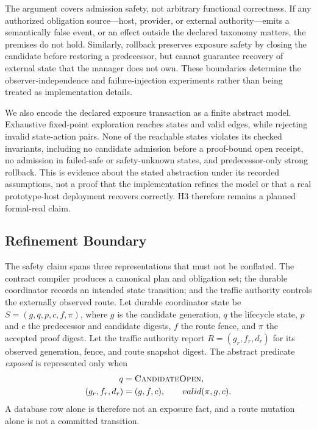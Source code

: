 \documentclass[letterpaper,twocolumn,10pt]{article}
\begin{document}
The argument covers admission safety, not arbitrary functional correctness.
If any authorized obligation source---host, provider, or external
authority---emits a semantically false event, or an effect outside the declared
taxonomy matters, the premises do not hold.  Similarly,
rollback preserves exposure safety by closing the candidate before restoring a
predecessor, but cannot guarantee recovery of external state that the manager
does not own.  These boundaries determine the observer-independence and
failure-injection experiments rather than being treated as implementation
details.

We also encode the declared exposure transaction as a finite abstract model.
Exhaustive fixed-point exploration reaches \ECPATransactionModelStates{} states
and \ECPATransactionModelEdges{} valid edges, while rejecting
\ECPATransactionModelRejections{} invalid state-action pairs.  None of the
reachable states violates its \ECPATransactionModelInvariants{} checked
invariants, including no candidate admission before a proof-bound open receipt,
no admission in failed-safe or safety-unknown states, and predecessor-only
strong rollback.  This is evidence about the stated abstraction under its
recorded assumptions, not a proof that the implementation refines the model or
that a real prototype-host deployment recovers correctly.  H3 therefore remains a
planned formal-real claim.

\subsection{Refinement Boundary}
The safety claim spans three representations that must not be conflated.  The
contract compiler produces a canonical plan and obligation set; the durable
coordinator records an intended state transition; and the traffic authority
controls the externally observed route.  Let durable coordinator state be
$S=(g,q,p,c,f,\pi)$, where $g$ is the candidate generation, $q$ the lifecycle
state, $p$ and $c$ the predecessor and candidate digests, $f$ the route fence,
and $\pi$ the accepted proof digest.  Let the traffic authority report
$R=(g_r,f_r,d_r)$ for its observed generation, fence, and route snapshot
digest.  The abstract predicate \emph{exposed} is represented only when
\begin{equation*}
\begin{aligned}
q &= \textsc{CandidateOpen}, \\
(g_r,f_r,d_r) &= (g,f,c), \qquad valid(\pi,g,c).
\end{aligned}
\end{equation*}
A database row alone is therefore not an exposure fact, and a route mutation
alone is not a committed transition.
\end{document}

